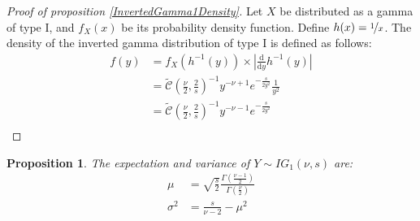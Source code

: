 \documentclass{amsart}
\theoremstyle{plain}
\newtheorem{proposition}{Proposition}[section]
\theoremstyle{remark}
\numberwithin{equation}{section}
\begin{document}
\begin{proof}[Proof of proposition \ref{InvertedGamma1Density}]
  Let $X$ be distributed as a gamma of type I, and $f_X(x)$ be its
  probability density function. Define $h(x) = \nicefrac{1}{x}$. The
  density of the inverted gamma distribution of type I is defined as
  follows:
  \[
    \begin{split}
      f(y) &= f_X\left(h^{-1}(y)\right) \times \left|\frac{\mathrm d}{\mathrm dy}h^{-1}(y)\right|\\
      &= \widetilde{\mathcal C}\left(\frac{\nu}{2}, \frac{2}{s}\right)^{-1}y^{-\nu+1}e^{-\frac{s}{2 y^2}}\frac{1}{y^2}\\
      &= \widetilde{\mathcal C}\left(\frac{\nu}{2}, \frac{2}{s}\right)^{-1}y^{-\nu-1}e^{-\frac{s}{2 y^2}}\\
    \end{split}
  \]
\end{proof}

\begin{proposition}\label{InvertedGamma1Moments}
  The expectation and variance of $Y\sim IG_1(\nu, s)$ are:
  \[
    \begin{split}
      \mu &= \sqrt{\frac{s}{2}}\frac{\Gamma\left(\frac{\nu-1}{2}\right)}{\Gamma\left(\frac{\nu}{2}\right)}\\
      \sigma^2 &= \frac{s}{\nu-2}-\mu^2
    \end{split}
  \]
\end{proposition}
\end{document}
